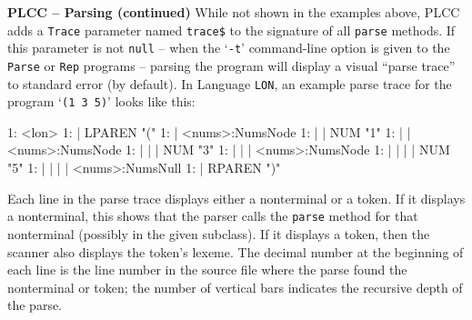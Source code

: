 \begin{minipage}[t]{\sw}
\slidenumber
\LARGE
{\bf PLCC -- Parsing (continued)}\exx
\Large
While not shown in the examples above,
PLCC adds a \verb'Trace' parameter named \verb'trace$'
to the signature of all \verb'parse' methods.
If this parameter is not \verb'null' --
when the `\verb'-t'' command-line option is given
to the \verb'Parse' or \verb'Rep' programs --
parsing the program
will display a visual ``parse trace'' to standard error (by default).
In Language \verb'LON', an example parse trace
for the program `\verb'(1 3 5)'' looks like this:
\begin{qv}
   1: <lon>
   1: | LPAREN "("
   1: | <nums>:NumsNode
   1: | | NUM "1"
   1: | | <nums>:NumsNode
   1: | | | NUM "3"
   1: | | | <nums>:NumsNode
   1: | | | | NUM "5"
   1: | | | | <nums>:NumsNull
   1: | RPAREN ")"
\end{qv}
Each line in the parse trace displays
either a nonterminal or a token.
If it displays a nonterminal,
this shows that the parser calls
the \verb'parse' method for that nonterminal
(possibly in the given subclass).
If it displays a token,
then the scanner also displays the token's lexeme.
The decimal number at the beginning of each line
is the line number in the source file where the parse found
the nonterminal or token;
the number of vertical bars indicates
the recursive depth of the parse.
\end{minipage}
\clearpage
